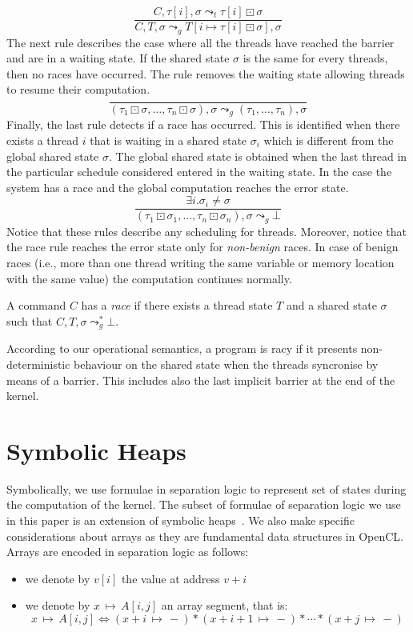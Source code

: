 \documentclass[a4paper,11pt]{llncs}
\newcommand{\wait}{\boxdot}
\newcommand{\psto}{{\,{\mapsto}\,}}
\newcounter{note_number}
\begin{document}
\[
\frac{C,\tau[i],\sigma \leadsto_t \tau[i] \wait \sigma}{C,T,\sigma \leadsto_g T[i \mapsto \tau[i] \wait \sigma],\sigma}
\]
The next rule describes the case where all the threads have reached the barrier and are in a waiting state. If the shared state $\sigma$ is the same for every threads, then no races have occurred. The rule removes the waiting state allowing threads to resume their computation.
\[
  \frac{}{(\tau_1 \wait \sigma, \dots, \tau_n \wait\sigma), \sigma \leadsto_g (\tau_1,\dots,\tau_n),\sigma}
\]
Finally, the last rule detects if a race has occurred. This is identified when there exists a thread $i$ that is waiting in a shared state $\sigma_i$ which is different from the global shared state $\sigma$. The global shared state is  obtained when the last thread in the particular schedule considered entered in the waiting state.  In the case the system has a race and  the global computation reaches the error state.
\[
  \frac{\exists i. \sigma_i \neq \sigma}{(\tau_1 \wait \sigma_1, \dots, \tau_n \wait\sigma_n), \sigma \leadsto_g \bot}
\]
Notice that these rules describe any scheduling for threads. Moreover, notice that the race rule reaches the error state only for {\em non-benign} races. 
In case of benign races (i.e., more than one thread writing the same variable or memory location with the same value) the computation continues normally. 
\begin{definition}
A command $C$ has a {\em race} if there exists a thread state $T$ and a shared state $\sigma$ such that $C,T,\sigma \leadsto^*_g \bot$.
\end{definition}
According to our operational semantics, a program is racy if it presents non-deterministic behaviour on the shared state when the threads syncronise by means of a barrier. This includes also the last implicit barrier at the end of the kernel.

\section{Symbolic Heaps}
\label{sec:symbolic-heaps}
Symbolically, we use formulae in separation logic to represent set of states
during the computation of the kernel.
The subset of formulae of separation logic we use in this paper is an extension of symbolic heaps~\cite{DistefanoOHearnYang06}. We also make specific considerations about arrays as they are fundamental data structures in OpenCL.\\

\noindent
Arrays are encoded in separation logic as follows:
\begin{itemize}
 \item we denote by $v[i]$ the value at address $v + i$
 \item we denote by $x \psto A[i, j]$ an array segment, that is:
 	$$x \psto A[i, j] \Leftrightarrow  (x + i \psto -) * (x + i + 1 \psto -) * \cdots * (x + j \psto -)$$
\end{itemize}
\end{document}
